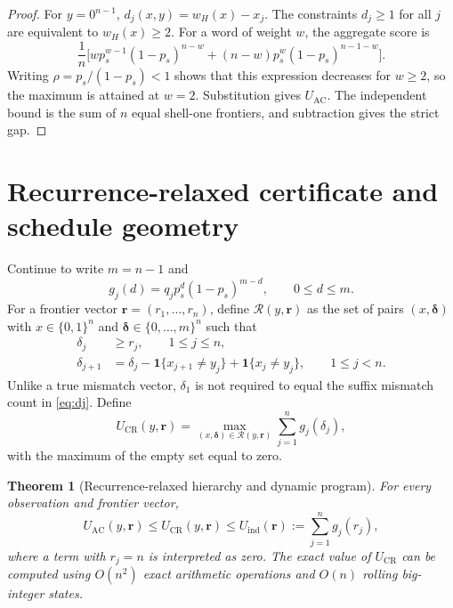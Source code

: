\documentclass[11pt]{article}
\newtheorem{theorem}{Theorem}
\theoremstyle{remark}
\newcommand{\ind}{\mathbf 1}
\begin{document}
\begin{proof}
For $y=0^{n-1}$, $d_j(x,y)=w_H(x)-x_j$. The constraints $d_j\ge1$ for all $j$ are
equivalent to $w_H(x)\ge2$. For a word of weight $w$, the aggregate score is
\[
 \frac1n\bigl[w p_s^{w-1}(1-p_s)^{n-w}
 +(n-w)p_s^w(1-p_s)^{n-1-w}\bigr].
\]
Writing $\rho=p_s/(1-p_s)<1$ shows that this expression decreases for $w\ge2$, so the
maximum is attained at $w=2$. Substitution gives $U_{\mathrm{AC}}$. The independent
bound is the sum of $n$ equal shell-one frontiers, and subtraction gives the strict gap.
\end{proof}

\section{Recurrence-relaxed certificate and schedule geometry}

Continue to write $m=n-1$ and
\[
 g_j(d)=q_jp_s^d(1-p_s)^{m-d},\qquad 0\le d\le m.
\]
For a frontier vector $\mathbf r=(r_1,\ldots,r_n)$, define
$\mathcal R(y,\mathbf r)$ as the set of pairs
$(x,\boldsymbol\delta)$ with $x\in\{0,1\}^n$ and
$\boldsymbol\delta\in\{0,\ldots,m\}^n$ such that
\begin{align}
 \delta_j&\ge r_j,\qquad 1\le j\le n,\label{eq:cr-threshold}\\
 \delta_{j+1}&=\delta_j-\ind\{x_{j+1}\ne y_j\}
                  +\ind\{x_j\ne y_j\},\qquad 1\le j<n.\label{eq:cr-recurrence}
\end{align}
Unlike a true mismatch vector, $\delta_1$ is not required to equal the suffix mismatch
count in \eqref{eq:dj}. Define
\[
 U_{\mathrm{CR}}(y,\mathbf r)=
 \max_{(x,\boldsymbol\delta)\in\mathcal R(y,\mathbf r)}
 \sum_{j=1}^n g_j(\delta_j),
\]
with the maximum of the empty set equal to zero.

\begin{theorem}[Recurrence-relaxed hierarchy and dynamic program]
For every observation and frontier vector,
\[
 U_{\mathrm{AC}}(y,\mathbf r)
 \le U_{\mathrm{CR}}(y,\mathbf r)
 \le U_{\mathrm{ind}}(\mathbf r):=\sum_{j=1}^n g_j(r_j),
\]
where a term with $r_j=n$ is interpreted as zero. The exact value of $U_{\mathrm{CR}}$ can be computed using $O(n^2)$ exact arithmetic operations and $O(n)$ rolling big-integer states.
\end{theorem}
\end{document}
